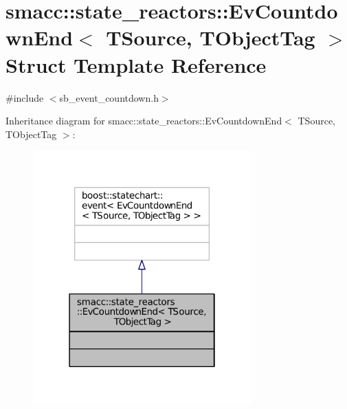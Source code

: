 \hypertarget{structsmacc_1_1state__reactors_1_1EvCountdownEnd}{}\section{smacc\+:\+:state\+\_\+reactors\+:\+:Ev\+Countdown\+End$<$ T\+Source, T\+Object\+Tag $>$ Struct Template Reference}
\label{structsmacc_1_1state__reactors_1_1EvCountdownEnd}


{\ttfamily \#include $<$sb\+\_\+event\+\_\+countdown.\+h$>$}



Inheritance diagram for smacc\+:\+:state\+\_\+reactors\+:\+:Ev\+Countdown\+End$<$ T\+Source, T\+Object\+Tag $>$\+:
\nopagebreak
\begin{figure}[H]
\begin{center}
\leavevmode
\includegraphics[width=238pt]{structsmacc_1_1state__reactors_1_1EvCountdownEnd__inherit__graph}
\end{center}
\end{figure}


